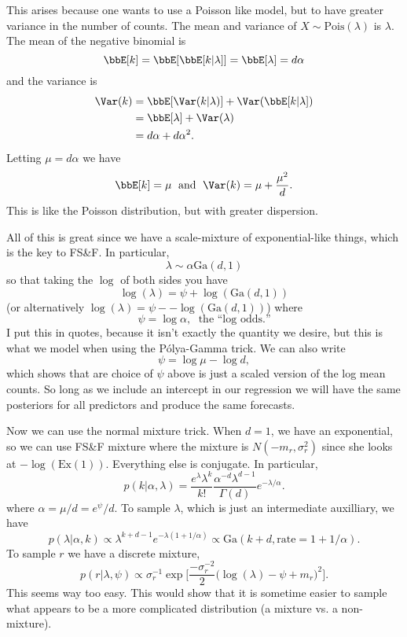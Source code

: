 \documentclass{article}
\newcommand{\Polya}{P\'{o}lya}
\begin{document}
This arises because one wants to use a Poisson like model, but to have greater
variance in the number of counts.  The mean and variance of $X \sim
\text{Pois}(\lambda)$ is $\lambda$.  The mean of the negative binomial is
\[
\bbE[k] = \bbE[\bbE[k|\lambda]] = \bbE[\lambda] = d \alpha
\]
and the variance is
\begin{align*}
\Var(k) & = \bbE[\Var(k|\lambda)] + \Var(\bbE[k|\lambda]) \\
& = \bbE[\lambda] + \Var(\lambda) \\
& = d \alpha + d \alpha^2.
\end{align*}
Letting $\mu = d \alpha$ we have
\[
\bbE[k] = \mu \; \text{ and } \; \Var(k) = \mu + \frac{\mu^2}{d}.
\]
This is like the Poisson distribution, but with greater dispersion.

All of this is great since we have a scale-mixture of exponential-like things,
which is the key to FS\&F.  In particular,
\[
\lambda \sim \alpha \text{Ga}(d, 1)
\]
so that taking the $\log$ of both sides you have
\[
\log(\lambda) = \psi + \log(\text{Ga}(d,1))
\]
(or alternatively $\log (\lambda) = \psi - - \log(\text{Ga}(d,1))$) where
\[
\psi = \log \alpha, \; \text{ the ``log odds.''}
\]
I put this in quotes, because it isn't exactly the quantity we desire, but this
is what we model when using the \Polya-Gamma trick.  We can also write
\[
\psi = \log \mu - \log d,
\]
which shows that are choice of $\psi$ above is just a scaled version of the log
mean counts.  So long as we include an intercept in our regression we will have
the same posteriors for all predictors and produce the same forecasts.

Now we can use the normal mixture trick.  When $d=1$, we have an exponential, so
we can use FS\&F mixture where the mixture is $N(-m_r, \sigma_r^2)$ since she
looks at $-\log(\text{Ex}(1))$.  Everything else is conjugate.  In particular,
\[
p(k | \alpha, \lambda) = \frac{e^\lambda \lambda^k}{k!} 
\frac{\alpha^{-d} \lambda^{d-1}}{\Gamma(d)} e^{-\lambda / \alpha}.
\]
where $\alpha = \mu / d = e^\psi / d$.  To sample $\lambda$, which is just an
intermediate auxilliary, we have
\[
p(\lambda | \alpha, k) \propto \lambda^{k+d-1} e^{-\lambda (1+1/\alpha)} \propto
\text{Ga}(k+d, \text{rate}=1+1/\alpha).
\]
To sample $r$ we have a discrete mixture,
\[
p(r|\lambda, \psi) \propto \sigma_{r}^{-1} \exp 
\Big[ \frac{-\sigma_r^{-2}}{2} \Big(\log(\lambda) - \psi + m_r \Big)^2 \Big].
\]
This seems way too easy.  This would show that it is sometime easier to sample
what appears to be a more complicated distribution (a mixture vs. a non-mixture).
\end{document}
